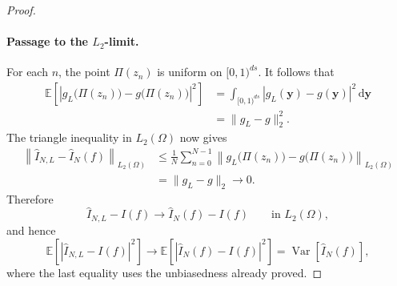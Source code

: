 \documentclass[11pt]{article}
\newcommand{\Var}{\operatorname{Var}}
\begin{document}
\begin{proof}
\paragraph{Passage to the \(L_2\)-limit.}
For each \(n\), the point \(\Pi(z_n)\) is uniform on \([0,1)^{ds}\).
It follows that
\[
\begin{aligned}
  \mathbb E\!\left[
    \left|
      g_L\bigl(\Pi(z_n)\bigr)-g\bigl(\Pi(z_n)\bigr)
    \right|^2
  \right]
  &=\int_{[0,1)^{ds}}
      |g_L(\boldsymbol y)-g(\boldsymbol y)|^2
      \,\mathrm d\boldsymbol y \\
  &=\lVert g_L-g\rVert_2^2.
\end{aligned}
\]
The triangle inequality in \(L_2(\Omega)\) now gives
\[
\begin{aligned}
  \left\|
    \widehat I_{N,L}-\widehat I_N(f)
  \right\|_{L_2(\Omega)}
  &\leq\frac1N\sum_{n=0}^{N-1}
    \left\|
      g_L\bigl(\Pi(z_n)\bigr)-g\bigl(\Pi(z_n)\bigr)
    \right\|_{L_2(\Omega)} \\
  &=\lVert g_L-g\rVert_2
    \longrightarrow0.
\end{aligned}
\]
Therefore
\[
  \widehat I_{N,L}-I(f)
  \longrightarrow
  \widehat I_N(f)-I(f)
  \qquad\text{in }L_2(\Omega),
\]
and hence
\[
  \mathbb E\!\left[
    \left|\widehat I_{N,L}-I(f)\right|^2
  \right]
  \longrightarrow
  \mathbb E\!\left[
    \left|\widehat I_N(f)-I(f)\right|^2
  \right]
  =\Var[\widehat I_N(f)],
\]
where the last equality uses the unbiasedness already proved.


\end{proof}
\end{document}
